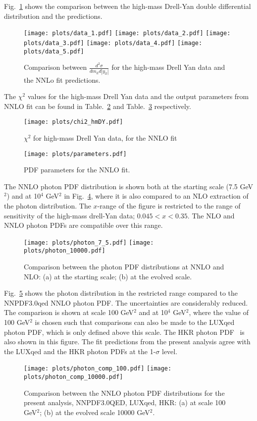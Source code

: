 Fig.~\ref{hmDY_2D} 
shows the comparison between the high-mass Drell-Yan double differential distribution and 
the predictions.
\begin{figure}
\centering
\texttt{[image: plots/data\_1.pdf]} 
\texttt{[image: plots/data\_2.pdf]} 
\texttt{[image: plots/data\_3.pdf]} 
\texttt{[image: plots/data\_4.pdf]} 
\texttt{[image: plots/data\_5.pdf]} 
\caption{Comparison between $\frac{d^{2}\sigma}{dm_{ll}d|y_{ll}|}$ for the high-mass Drell Yan data and the NNLo fit predictions.}
\label{hmDY_2D}
\end{figure}
The $\chi^{2}$ values for the high-mass Drell Yan data and the output parameters from NNLO fit can be found in Table.~\ref{chi2_scan} 
and Table.~\ref{par_scan} 
respectively. 
\begin{figure}
\texttt{[image: plots/chi2\_hmDY.pdf]} 
\caption{$\chi^{2}$ for high-mass Drell Yan data, for the NNLO fit}
\label{chi2_scan}
\end{figure}
\begin{figure}
\texttt{[image: plots/parameters.pdf]} 
\caption{PDF parameters for the NNLO fit.}
\label{par_scan}
\end{figure}

The NNLO photon PDF distribution is shown 
both at the starting scale (7.5 GeV$^{2}$) and at 10$^{4}$ GeV$^{2}$ 
 in Fig.~\ref{photon}, where it is also compared to an NLO extraction of the photon distribution.
The $x$-range of the figure is restricted to the range of sensitivity of the high-mass drell-Yan data;
$0.045 < x < 0.35$. The NLO and NNLO photon PDFs are compatible over this range.
\begin{figure}
\texttt{[image: plots/photon\_7\_5.pdf]} 
\texttt{[image: plots/photon\_10000.pdf]} 
\caption{Comparison between the photon PDF distributions at NNLO and NLO: (a) at the starting scale; (b) at the evolved scale.}
\label{photon}
\end{figure}

Fig.~\ref{photon_zoom} 
shows the photon distribution in the restricted range compared to the NNPDF3.0qed NNLO photon PDF.
The uncertainties are considerably reduced.
%
The comparison is shown at scale 100 GeV$^{2}$ and 
at 10$^{4}$ GeV$^{2}$, where the value of 100 GeV$^{2}$ is chosen such that comparisons can also be 
made to the LUXqed~\cite{Manohar:2016nzj}
photon PDF, which is only defined above this scale.
%
The 
HKR photon PDF~\cite{Harland-Lang:2016apc} is also shown in this figure.
%
The fit predictions from the present analysis
agree  with the LUXqed and the HKR photon PDFs at the 1-$\sigma$ level. 

\begin{figure}
\texttt{[image: plots/photon\_comp\_100.pdf]} 
\texttt{[image: plots/photon\_comp\_10000.pdf]} 
\caption{Comparison between the NNLO photon PDF distributions for the present analysis, NNPDF3.0QED, LUXqed, HKR: (a) at scale 100 GeV$^{2}$; (b) at the evolved scale 10000 GeV$^{2}$.}
\label{photon_zoom}
\end{figure}

